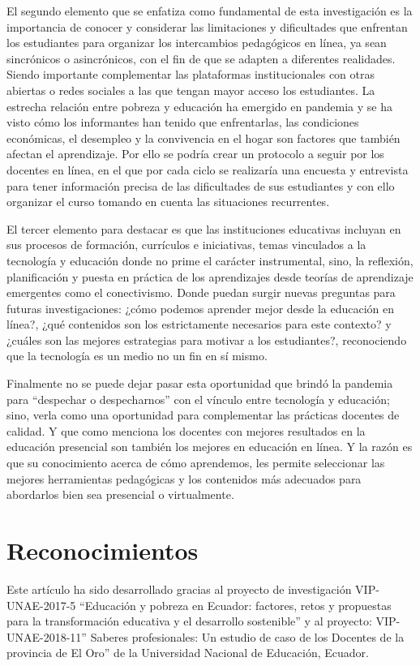 \documentclass{textolivre}
\begin{document}
El segundo elemento que se enfatiza como fundamental de esta investigación es la importancia de conocer y considerar las limitaciones y dificultades que enfrentan los estudiantes para organizar los intercambios pedagógicos en línea, ya sean sincrónicos o asincrónicos, con el fin de que se adapten a diferentes realidades. Siendo importante complementar las plataformas institucionales con otras abiertas o redes sociales a las que tengan mayor acceso los estudiantes. La estrecha relación entre pobreza y educación ha emergido en pandemia y se ha visto cómo los informantes han tenido que enfrentarlas, las condiciones económicas, el desempleo y la convivencia en el hogar son factores que también afectan el aprendizaje. Por ello se podría crear un protocolo a seguir por los docentes en línea, en el que por cada ciclo se realizaría una encuesta y entrevista para tener información precisa de las dificultades de sus estudiantes y con ello organizar el curso tomando en cuenta las situaciones recurrentes.

El tercer elemento para destacar es que las instituciones educativas incluyan en sus procesos de formación, currículos e iniciativas, temas vinculados a la tecnología y educación donde no prime el carácter instrumental, sino, la reflexión, planificación y puesta en práctica de los aprendizajes desde teorías de aprendizaje emergentes como el conectivismo. Donde puedan surgir nuevas preguntas para futuras investigaciones: ¿cómo podemos aprender mejor desde la educación en línea?, ¿qué contenidos son los estrictamente necesarios para este contexto? y ¿cuáles son las mejores estrategias para motivar a los estudiantes?, reconociendo que la tecnología es un medio no un fin en sí mismo.

Finalmente no se puede dejar pasar esta oportunidad que brindó la pandemia para “despechar o despecharnos” con el vínculo entre tecnología y educación; sino, verla como una oportunidad para complementar las prácticas docentes de calidad. Y que como menciona \textcite{christodoulou_teachers_2020} los docentes con mejores resultados en la educación presencial son también los mejores en educación en línea. Y la razón es que su conocimiento acerca de cómo aprendemos, les permite seleccionar las mejores herramientas pedagógicas y los contenidos más adecuados para abordarlos bien sea presencial o virtualmente.

\section{Reconocimientos}\label{sec-organizacao-latex}
Este artículo ha sido desarrollado gracias al proyecto de investigación VIP-UNAE-2017-5 “Educación y pobreza en Ecuador: factores, retos y propuestas para la transformación educativa y el desarrollo sostenible” y al proyecto: VIP-UNAE-2018-11” Saberes profesionales: Un estudio de caso de los Docentes de la provincia de El Oro” de la Universidad Nacional de Educación, Ecuador.

\printbibliography\label{sec-bib}
\end{document}
